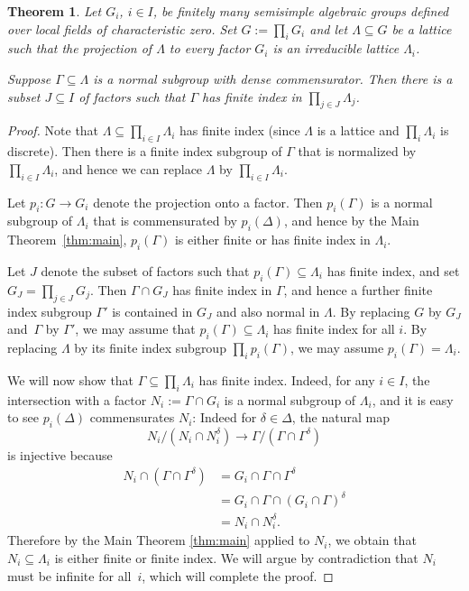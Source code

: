 \documentclass[JEP,XML,SOM,Unicode,published]{cedram}
\newtheorem{thm}{Theorem}[section]
\theoremstyle{definition}
\begin{document}
\begin{thm}\label{thm:reducible}
Let $G_i$, $i\in I$, be finitely many semisimple algebraic groups defined over local fields of characteristic zero. Set $G:=\prod_i G_i$ and let $\Lambda\subseteq G$ be a lattice such that the projection of $\Lambda$ to every factor $G_i$ is an irreducible lattice $\Lambda_i$.

Suppose $\Gamma\subseteq \Lambda$ is a normal subgroup with dense commensurator. Then there is a subset $J\subseteq I$ of factors such that $\Gamma$ has finite index in $\prod_{j\in J} \Lambda_j$.
\end{thm}
\begin{proof} Note that $\Lambda\subseteq \prod_{i\in I} \Lambda_i$ has finite index (since $\Lambda$ is a lattice and $\prod_i \Lambda_i$ is discrete). Then there is a finite index subgroup of $\Gamma$ that is normalized by $\prod_{i\in I} \Lambda_i$, and hence we can replace $\Lambda$ by $\prod_{i\in I} \Lambda_i$.

Let $p_i:G\to G_i$ denote the projection onto a factor. Then $p_i(\Gamma)$ is a normal subgroup of $\Lambda_i$ that is commensurated by $p_i(\Delta)$, and hence by the Main Theorem~\ref{thm:main}, $p_i(\Gamma)$ is either finite or has finite index in $\Lambda_i$.

Let $J$ denote the subset of factors such that $p_i(\Gamma)\subseteq\Lambda_i$ has finite index, and set $G_J=\prod_{j\in J} G_j$. Then $\Gamma\cap G_J$ has finite index in $\Gamma$, and hence a further finite index subgroup $\Gamma'$ is contained in $G_J$ and also normal in $\Lambda$. By replacing $G$ by $G_J$ and~$\Gamma$ by $\Gamma'$, we may assume that $p_i(\Gamma)\subseteq \Lambda_i$ has finite index for all $i$. By replacing $\Lambda$ by its finite index subgroup $\prod_i p_i(\Gamma)$, we may assume $p_i(\Gamma)=\Lambda_i$.

We will now show that $\Gamma\subseteq \prod_i \Lambda_i$ has finite index. Indeed, for any $i\in I$, the intersection with a factor $N_i:=\Gamma\cap G_i$ is a normal subgroup of $\Lambda_i$, and it is easy to see $p_i(\Delta)$ commensurates $N_i$: Indeed for $\delta\in\Delta$, the natural map
\[
N_i/(N_i\cap N_i^\delta) \to \Gamma / (\Gamma\cap\Gamma^\delta)
\]
is injective because
\begin{align*}
N_i\cap (\Gamma \cap \Gamma^\delta) &= G_i \cap \Gamma\cap \Gamma^\delta \\
&= G_i\cap \Gamma \cap (G_i\cap \Gamma)^\delta \\
&= N_i\cap N_i^\delta.
\end{align*}
Therefore by the Main Theorem \ref{thm:main} applied to $N_i$, we obtain that $N_i\subseteq \Lambda_i$ is either finite or finite index. We will argue by contradiction that $N_i$ must be infinite for all~$i$, which will complete the proof.


\end{proof}
\end{document}
